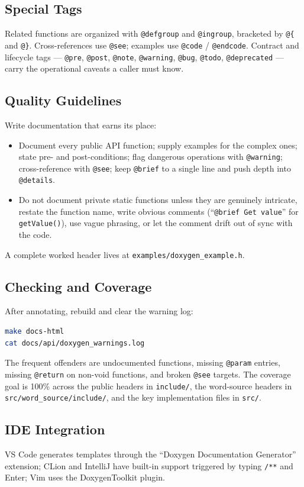 \subsection{Special Tags}

Related functions are organized with \texttt{@defgroup} and \texttt{@ingroup},
bracketed by \texttt{@\{} and \texttt{@\}}. Cross-references use \texttt{@see};
examples use \texttt{@code} / \texttt{@endcode}. Contract and lifecycle tags ---
\texttt{@pre}, \texttt{@post}, \texttt{@note}, \texttt{@warning},
\texttt{@bug}, \texttt{@todo}, \texttt{@deprecated} --- carry the operational
caveats a caller must know.

\subsection{Quality Guidelines}

Write documentation that earns its place:

\begin{itemize}
  \item Document every public API function; supply examples for the complex
    ones; state pre- and post-conditions; flag dangerous operations with
    \texttt{@warning}; cross-reference with \texttt{@see}; keep \texttt{@brief}
    to a single line and push depth into \texttt{@details}.
  \item Do not document private static functions unless they are genuinely
    intricate, restate the function name, write obvious comments (``\texttt{@brief
    Get value}'' for \texttt{getValue()}), use vague phrasing, or let the
    comment drift out of sync with the code.
\end{itemize}

A complete worked header lives at \texttt{examples/doxygen\_example.h}.

\subsection{Checking and Coverage}

After annotating, rebuild and clear the warning log:

\begin{lstlisting}[language=bash]
make docs-html
cat docs/api/doxygen_warnings.log
\end{lstlisting}

The frequent offenders are undocumented functions, missing \texttt{@param}
entries, missing \texttt{@return} on non-void functions, and broken
\texttt{@see} targets. The coverage goal is 100\% across the public headers in
\texttt{include/}, the word-source headers in
\texttt{src/word\_source/include/}, and the key implementation files in
\texttt{src/}.

\subsection{IDE Integration}

VS Code generates templates through the ``Doxygen Documentation Generator''
extension; CLion and IntelliJ have built-in support triggered by typing
\texttt{/**} and Enter; Vim uses the DoxygenToolkit plugin.
